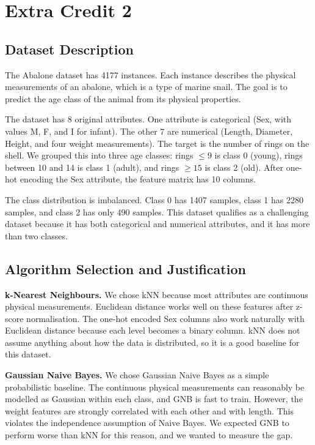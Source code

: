 \documentclass[11pt,letterpaper]{article}
\begin{document}
\section{Extra Credit 2}

\subsection{Dataset Description}

The Abalone dataset has 4177 instances. Each instance describes the physical
measurements of an abalone, which is a type of marine snail. The goal is to
predict the age class of the animal from its physical properties.

The dataset has 8 original attributes. One attribute is categorical (Sex, with
values M, F, and I for infant). The other 7 are numerical (Length, Diameter,
Height, and four weight measurements). The target is the number of rings on
the shell. We grouped this into three age classes: rings $\leq 9$ is class 0
(young), rings between 10 and 14 is class 1 (adult), and rings $\geq 15$ is
class 2 (old). After one-hot encoding the Sex attribute, the feature matrix
has 10 columns.

The class distribution is imbalanced. Class 0 has 1407 samples, class 1 has
2280 samples, and class 2 has only 490 samples. This dataset qualifies as a
challenging dataset because it has both categorical and numerical attributes,
and it has more than two classes.

\subsection{Algorithm Selection and Justification}

\textbf{k-Nearest Neighbours.} We chose kNN because most attributes are
continuous physical measurements. Euclidean distance works well on these
features after z-score normalisation. The one-hot encoded Sex columns also
work naturally with Euclidean distance because each level becomes a binary
column. kNN does not assume anything about how the data is distributed, so it
is a good baseline for this dataset.

\textbf{Gaussian Naive Bayes.} We chose Gaussian Naive Bayes as a simple
probabilistic baseline. The continuous physical measurements can reasonably be
modelled as Gaussian within each class, and GNB is fast to train. However, the
weight features are strongly correlated with each other and with length. This
violates the independence assumption of Naive Bayes. We expected GNB to
perform worse than kNN for this reason, and we wanted to measure the gap.
\end{document}
